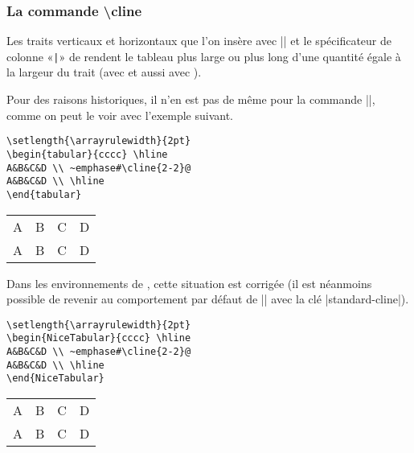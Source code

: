 \documentclass[dvipsnames]{article}%
\begin{document}
\subsubsection{La commande  \textbackslash cline}

\label{remark-cline}

Les traits verticaux et horizontaux que l'on insère avec |\hline| et le
spécificateur de colonne «\verb+|+» de  rendent le tableau plus large
ou plus long d'une quantité égale à la largeur du trait (avec  et
aussi avec ).

\smallskip
Pour des raisons historiques, il n'en est pas de même pour la commande |\cline|,
comme on peut le voir avec l'exemple suivant.

\medskip
\begin{BVerbatim}[baseline=c,boxwidth=10cm]
\setlength{\arrayrulewidth}{2pt}
\begin{tabular}{cccc} \hline
A&B&C&D \\ ~emphase#\cline{2-2}@
A&B&C&D \\ \hline
\end{tabular}
\end{BVerbatim}
%
\begin{scope}
\setlength{\arrayrulewidth}{2pt}
\begin{tabular}[c]{cccc}
\hline
A&B&C&D \\
\cline{2-2}
A&B&C&D \\
\hline
\end{tabular}
\end{scope}

\medskip
Dans les environnements de , cette situation est corrigée (il
est néanmoins possible de revenir au comportement par défaut de |\cline| avec la
clé |standard-cline|).

\medskip
\begin{BVerbatim}[baseline=c,boxwidth=10cm]
\setlength{\arrayrulewidth}{2pt}
\begin{NiceTabular}{cccc} \hline
A&B&C&D \\ ~emphase#\cline{2-2}@
A&B&C&D \\ \hline
\end{NiceTabular}
\end{BVerbatim}
%
\begin{scope}
\setlength{\arrayrulewidth}{2pt}
\begin{NiceTabular}[c]{cccc}
\hline
A&B&C&D \\
A&B&C&D \\
\hline
\end{NiceTabular}
\end{scope}
\end{document}

